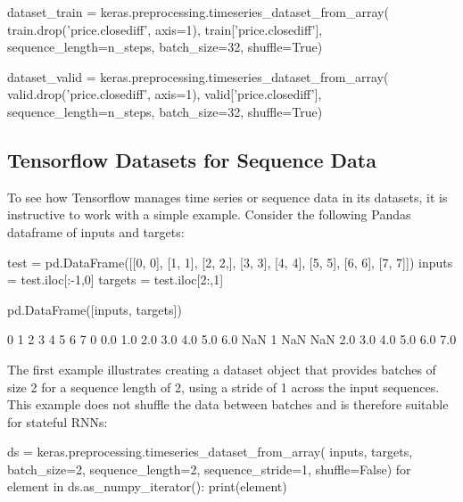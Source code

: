 \begin{samepage}
\begin{pythoncode}
dataset_train = keras.preprocessing.timeseries_dataset_from_array(
    train.drop('price.closediff', axis=1), train['price.closediff'],
    sequence_length=n_steps,
    batch_size=32,
    shuffle=True)

dataset_valid = keras.preprocessing.timeseries_dataset_from_array(
    valid.drop('price.closediff', axis=1), valid['price.closediff'],
    sequence_length=n_steps,
    batch_size=32,
    shuffle=True)
\end{pythoncode}
\end{samepage}

\subsection*{Tensorflow Datasets for Sequence Data}

To see how Tensorflow manages time series or sequence data in its datasets, it is instructive to work with a simple example. Consider the following Pandas dataframe of inputs and targets:

\begin{samepage}
\begin{pythoncode}
test = pd.DataFrame([[0, 0], [1, 1], [2, 2,], [3, 3], 
                     [4, 4], [5, 5], [6, 6], [7, 7]]) 
inputs = test.iloc[:-1,0]
targets = test.iloc[2:,1]

pd.DataFrame([inputs, targets])
\end{pythoncode}
\end{samepage}

\begin{samepage}
\begin{textcode}
     0    1    2    3    4    5    6    7
0  0.0  1.0  2.0  3.0  4.0  5.0  6.0  NaN
1  NaN  NaN  2.0  3.0  4.0  5.0  6.0  7.0
\end{textcode}
\end{samepage}

The first example illustrates creating a dataset object that provides batches of size 2 for a sequence length of 2, using a stride of 1 across the input sequences. This example does not shuffle the data between batches and is therefore suitable for stateful RNNs:

\begin{samepage}
\begin{pythoncode}
ds = keras.preprocessing.timeseries_dataset_from_array(
     inputs, targets,
     batch_size=2, sequence_length=2, sequence_stride=1, shuffle=False)
for element in ds.as_numpy_iterator():
     print(element)
\end{pythoncode}
\end{samepage}

